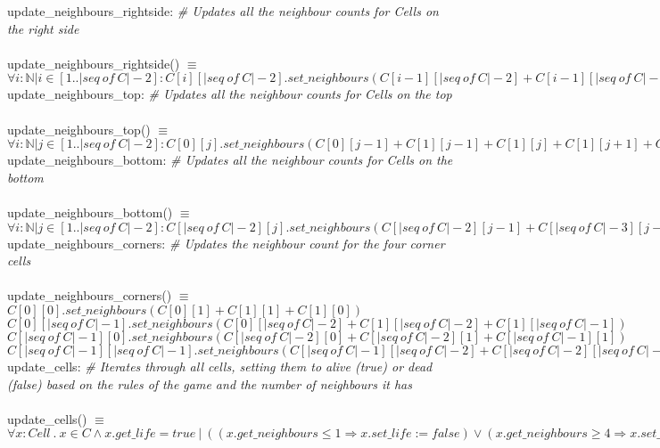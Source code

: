 \documentclass[12pt]{article}
\begin{document}
\noindent
update\_neighbours\_rightside: \textit{\# Updates all the neighbour counts for Cells on the right side}\\
\\
update\_neighbours\_rightside() $\equiv$ $\forall i : \mathbb{N} | i \in [1..|seq \ of \ C|-2] : C[i][|seq \ of \ C|-2].set\_neighbours(C[i-1][|seq \ of \ C|-2] + C[i-1][|seq \ of \ C|-3] + C[i][|seq \ of \ C|-3] + C[i+1][|seq \ of \ C|-3] + C[i+1][|seq \ of \ C|-2])$ \\

\noindent
update\_neighbours\_top: \textit{\# Updates all the neighbour counts for Cells on the top}\\
\\
update\_neighbours\_top() $\equiv$ $\forall i : \mathbb{N} | j \in [1..|seq \ of \ C|-2] : C[0][j].set\_neighbours(C[0][j-1] + C[1][j-1] + C[1][j] + C[1][j+1] + C[0][j+1|])$ \\

\noindent
update\_neighbours\_bottom: \textit{\# Updates all the neighbour counts for Cells on the bottom}\\
\\
update\_neighbours\_bottom() $\equiv$ $\forall i : \mathbb{N} | j \in [1..|seq \ of \ C|-2] : C[|seq \ of \ C|-2][j].set\_neighbours(C[|seq \ of \ C|-2][j-1] + C[|seq \ of \ C|-3][j-1] + C[|seq \ of \ C|-3][j] + C[|seq \ of \ C|-3][j+1] + C[|seq \ of \ C|-2][j+1|])$ \\

\noindent
update\_neighbours\_corners: \textit{\# Updates the neighbour count for the four corner cells}\\
\\
update\_neighbours\_corners() $\equiv$ \\
$C[0][0].set\_neighbours(C[0][1] + C[1][1] + C[1][0])$\\
$C[0][|seq \ of \ C|-1].set\_neighbours(C[0][|seq \ of \ C|-2] + C[1][|seq \ of \ C|-2] + C[1][|seq \ of \ C|-1])$\\
$C[|seq \ of \ C|-1][0].set\_neighbours(C[|seq \ of \ C|-2][0] + C[|seq \ of \ C|-2][1] + C[|seq \ of \ C|-1][1])$\\
$C[|seq \ of \ C|-1][|seq \ of \ C|-1].set\_neighbours(C[|seq \ of \ C|-1][|seq \ of \ C|-2] + C[|seq \ of \ C|-2][|seq \ of \ C|-2] + C[|seq \ of \ C|-2][|seq \ of \ C|-1])$\\

\noindent
update\_cells: \textit{\# Iterates through all cells, setting them to alive (true) or dead (false) based on the rules of the game and the number of neighbours it has}\\
\\
update\_cells() $\equiv$ \\
$\forall x : Cell \ . \ x \in C \land x.get\_life = true\ | \ ((x.get\_neighbours \leq 1 \Rightarrow x.set\_life := false) \lor 
(x.get\_neighbours \ge 4 \Rightarrow x.set\_life := false) \lor
(x.get\_neighbours > 1 \land x.get\_neighbours < 4 \Rightarrow x.set\_life := true))$ \\
\end{document}
